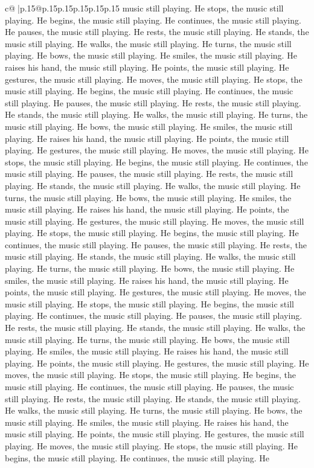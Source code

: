 \documentclass{article}
\begin{document}
{\begin{supertabular}{c@{$\;$}|p{.15\linewidth}@{}p{.15\linewidth}p{.15\linewidth}p{.15\linewidth}p{.15\linewidth}p{.15\linewidth}}
{{{music still playing. He stops, the music still playing. He begins, the music still playing. He continues, the music still playing. He pauses, the music still playing. He rests, the music still playing. He stands, the music still playing. He walks, the music still playing. He turns, the music still playing. He bows, the music still playing. He smiles, the music still playing. He raises his hand, the music still playing. He points, the music still playing. He gestures, the music still playing. He moves, the music still playing. He stops, the music still playing. He begins, the music still playing. He continues, the music still playing. He pauses, the music still playing. He rests, the music still playing. He stands, the music still playing. He walks, the music still playing. He turns, the music still playing. He bows, the music still playing. He smiles, the music still playing. He raises his hand, the music still playing. He points, the music still playing. He gestures, the music still playing. He moves, the music still playing. He stops, the music still playing. He begins, the music still playing. He continues, the music still playing. He pauses, the music still playing. He rests, the music still playing. He stands, the music still playing. He walks, the music still playing. He turns, the music still playing. He bows, the music still playing. He smiles, the music still playing. He raises his hand, the music still playing. He points, the music still playing. He gestures, the music still playing. He moves, the music still playing. He stops, the music still playing. He begins, the music still playing. He continues, the music still playing. He pauses, the music still playing. He rests, the music still playing. He stands, the music still playing. He walks, the music still playing. He turns, the music still playing. He bows, the music still playing. He smiles, the music still playing. He raises his hand, the music still playing. He points, the music still playing. He gestures, the music still playing. He moves, the music still playing. He stops, the music still playing. He begins, the music still playing. He continues, the music still playing. He pauses, the music still playing. He rests, the music still playing. He stands, the music still playing. He walks, the music still playing. He turns, the music still playing. He bows, the music still playing. He smiles, the music still playing. He raises his hand, the music still playing. He points, the music still playing. He gestures, the music still playing. He moves, the music still playing. He stops, the music still playing. He begins, the music still playing. He continues, the music still playing. He pauses, the music still playing. He rests, the music still playing. He stands, the music still playing. He walks, the music still playing. He turns, the music still playing. He bows, the music still playing. He smiles, the music still playing. He raises his hand, the music still playing. He points, the music still playing. He gestures, the music still playing. He moves, the music still playing. He stops, the music still playing. He begins, the music still playing. He continues, the music still playing. He }}}
\end{supertabular}}
\end{document}
